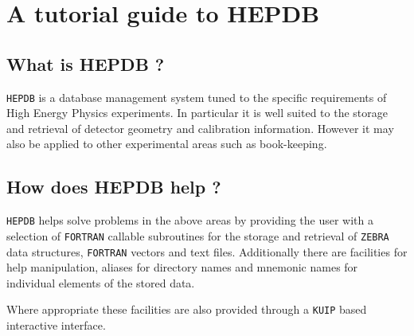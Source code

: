 %
\chapter{A tutorial guide to HEPDB}
%
%
%
%
\section{What is HEPDB ?}
{\tt HEPDB} is a database management system tuned to the specific requirements
of High Energy Physics experiments. In particular it is well suited to the storage
and retrieval of detector geometry and calibration information. However it may
also be applied to other experimental areas such as book-keeping.
%
%
%
\section{How does HEPDB help ?}
{\tt HEPDB} helps solve problems in the above areas by providing the user with
a selection of {\tt FORTRAN} callable subroutines for the storage and retrieval
of {\tt ZEBRA} data structures, {\tt FORTRAN} vectors and text files. Additionally there are
facilities for help manipulation, aliases for directory names and mnemonic names
for individual elements of the stored data.
\par
Where appropriate these facilities are also provided through a {\tt KUIP}
based interactive interface.
%
%
%
